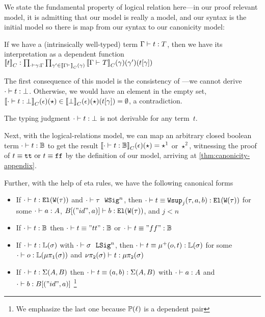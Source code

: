We state the fundamental property of logical relation here---in our proof relevant model, it is admitting that our model is really a model, and our syntax is the initial model so there is map from our syntax to our canonicity model:
\begin{lemma}
  If we have a (intrinsically well-typed) term $ {\Gamma} \vdash {t} : {T} $, then we have its interpretation as a dependent function ${\llbracket {t} \rrbracket}_C : \prod_{ {\cdot} \vdash {\ensuremath{\gamma}} : {\Gamma} } \prod_{\gamma' \in {\llbracket {\ensuremath{ {\Gamma} \vdash_{} }} \rrbracket}_C(\gamma)}{\llbracket {\ensuremath{ {\Gamma} \vdash_{} {T} }} \rrbracket}_C(\gamma)(\gamma')({t}\!\left[{\gamma}\right])$
\end{lemma}

The first consequence of this model is the consistency of \TT---we cannot derive
$ {\cdot} \vdash {t} : {\bot} $. Otherwise, we would have an element in the empty set,
${\llbracket {\ensuremath{ {\cdot} \vdash {t} : {\bot} }} \rrbracket}_C(\epsilon)(\star) \in
{\llbracket {\bot} \rrbracket}_C(\epsilon)(\star)({t}\!\left[{\gamma}\right]) = \emptyset$, a contradiction.

\begin{theorem}[Consistency]
  The typing judgment $ {\cdot} \vdash {t} : {\bot} $ is not derivable for any term~$t$.
\end{theorem}

Next, with the logical-relations model, we can map an arbitrary closed boolean
term $ {\cdot} \vdash {t} : {\mathbb{B}} $ to get the result
${\llbracket {\ensuremath{ {\cdot} \vdash {t} : {\mathbb{B}} }} \rrbracket}_C(\epsilon)(\star) = \star^1$ or $\star^2$,
witnessing the proof of $t \equiv \texttt{tt} \text{ or } t \equiv\texttt{ff}$ by the definition of our model, arriving at
\cref{thm:canonicity-appendix}.


Further, with the help of eta rules, we have the following canonical forms
\begin{theorem}\hfill
  \begin{itemize}
    \item If $ {\cdot} \vdash {t} : {\texttt{El}({\texttt{W}({\tau})})} $ and $ {\cdot} \vdash {\tau} \ \ \texttt{WSig}^{n} $, then $ {\cdot} \vdash {t \equiv \ensuremath{\texttt{Wsup}_{j}({\tau},{a},{b})}} : {\texttt{El}({\texttt{W}({\tau})})} $ for some $ {\cdot} \vdash {a} : {A} $, $ {B[("id", a)]} \vdash {b} : {\texttt{El}({\texttt{W}({\tau})})} $, and $j < n$
    \item If $ {\cdot} \vdash {t} : {\mathbb{B}} $ then $ {\cdot} \vdash {t \equiv "tt"} : {\mathbb{B}} $ or $ {\cdot} \vdash {t \equiv "ff"} : {\mathbb{B}} $ 
    \item If $ {\cdot} \vdash {t} : {\mathbb{L}({\sigma})} $ with $ {\cdot} \vdash {\sigma} \ \ \texttt{LSig}^{n} $, then $ {\cdot} \vdash {t \equiv \ensuremath{\mu^+({o},{t})}} : {\mathbb{L}({\sigma})} $ 
      for some $ {\cdot} \vdash {o} : {\mathbb{L}({\mu\pi_{\texttt{1}}({\sigma})})} $ and $ {\nu\pi_{\texttt{2}}({\sigma})} \vdash {t} : {\mu\pi_{\texttt{2}}({\sigma})} $
    \item If $ {\cdot} \vdash {t} : {\Sigma({A},{B})} $ then $ {\cdot} \vdash {t \equiv (a, b)} : {\Sigma({A},{B})} $ with $ {\cdot} \vdash {a} : {A} $ and $ {\cdot} \vdash {b} : {B[("id", a)]} $
    \footnote{We emphasize the last one because $\mathbb{P}({\ell})$ is a dependent pair}
  \end{itemize}
\end{theorem}

